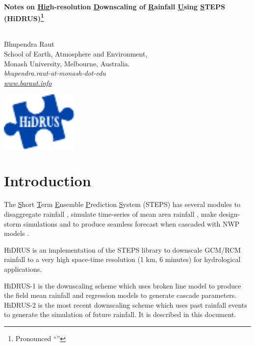 \documentclass[12pt, a4paper]{extarticle}
\begin{document}




{\Large \noindent \textbf{\textcolor{egyptianblue}{Notes on \underline{Hi}gh-resolution \underline{D}ownscaling of \underline{R}ainfall \underline{U}sing \underline{S}TEPS (HiDRUS)\footnote{Pronounced ``''}}}}\\
\\
\begin{minipage}{0.7\textwidth}
\normalsize Bhupendra Raut\\
{\small School of Earth, Atmosphere and Environment,}\\
{\small Monash University, Melbourne, Australia.}\\
\emph{bhupendra.raut-at-monash-dot-edu}\\
\emph{\href{www.baraut.info}{www.baraut.info}}\\
\end{minipage}
\begin{minipage}{0.25\textwidth}
\includegraphics[width=1.5in]{./hidrus-logo.pdf}
\end{minipage}


\vspace{3\baselineskip}
\tableofcontents

\section{Introduction}
The  \underline{S}hort \underline{T}erm \underline{E}nsemble \underline{P}rediction \underline{S}ystem (STEPS)  has several modules to disaggregate rainfall \citep{seed2013steps}, simulate time-series of mean area rainfall \citep{seed2000BL}, make design-storm simulations \citep{seed1999steps} and to produce seamless forecast when cascaded with NWP models \citep{bowler2006steps}.

HiDRUS is an implementation of the STEPS library to downscale GCM/RCM rainfall to a very high space-time resolution (1 km, 6 minutes) for hydrological applications. 

HiDRUS-1 is the downscaling scheme which uses broken line model to produce the field mean rainfall and regression models to generate cascade parameters. HiDRUS-2 is the most recent downscaling scheme which uses past rainfall events to generate the simulation of future rainfall. It is described in this document.
\end{document}
